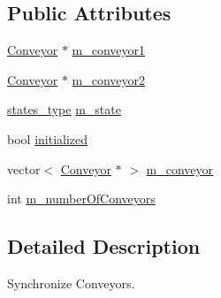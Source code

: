\subsection*{Public Attributes}
\begin{DoxyCompactItemize}
\item 
\hyperlink{classConveyor}{Conveyor} $\ast$ \hyperlink{classConveyorSynchronizer_a0b3932b4b2eb980377a01913ac7e31f7}{m\-\_\-conveyor1}
\item 
\hyperlink{classConveyor}{Conveyor} $\ast$ \hyperlink{classConveyorSynchronizer_a6d409ca27bf95110c977946158da2fed}{m\-\_\-conveyor2}
\item 
\hyperlink{classConveyorSynchronizer_ad503ce87e58a6567d30daf11bf9b97b5}{states\-\_\-type} \hyperlink{classConveyorSynchronizer_a74ead75da9c1863838b34cd288cae02f}{m\-\_\-state}
\item 
bool \hyperlink{classConveyorSynchronizer_aff3ac2926f3771d47d4954cc384e21f3}{initialized}
\item 
vector$<$ \hyperlink{classConveyor}{Conveyor} $\ast$ $>$ \hyperlink{classConveyorSynchronizer_a2df84a539b1399075936bafcb23a874d}{m\-\_\-conveyor}
\item 
int \hyperlink{classConveyorSynchronizer_a9e4513793155c94c434ab6403c937085}{m\-\_\-number\-Of\-Conveyors}
\end{DoxyCompactItemize}


\subsection{Detailed Description}
Synchronize Conveyors. 

